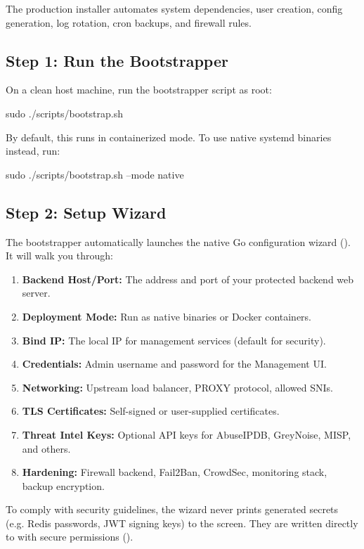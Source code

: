 The production installer automates system dependencies, user creation, config generation, log rotation, cron backups, and firewall rules.

\subsection{Step 1: Run the Bootstrapper}
On a clean host machine, run the bootstrapper script as root:
\begin{bashcode}
sudo ./scripts/bootstrap.sh
\end{bashcode}
By default, this runs in containerized mode. To use native systemd binaries instead, run:
\begin{bashcode}
sudo ./scripts/bootstrap.sh --mode native
\end{bashcode}

\subsection{Step 2: Setup Wizard}
The bootstrapper automatically launches the native Go configuration wizard (). It will walk you through:
\begin{enumerate}
  \item \textbf{Backend Host/Port:} The address and port of your protected backend web server.
  \item \textbf{Deployment Mode:} Run as native binaries or Docker containers.
  \item \textbf{Bind IP:} The local IP for management services (default  for security).
  \item \textbf{Credentials:} Admin username and password for the Management UI.
  \item \textbf{Networking:} Upstream load balancer, PROXY protocol, allowed SNIs.
  \item \textbf{TLS Certificates:} Self-signed or user-supplied certificates.
  \item \textbf{Threat Intel Keys:} Optional API keys for AbuseIPDB, GreyNoise, MISP, and others.
  \item \textbf{Hardening:} Firewall backend, Fail2Ban, CrowdSec, monitoring stack, backup encryption.
\end{enumerate}

\begin{warningbox}
To comply with security guidelines, the wizard never prints generated secrets (e.g. Redis passwords, JWT signing keys) to the screen. They are written directly to  with secure permissions ().
\end{warningbox}

